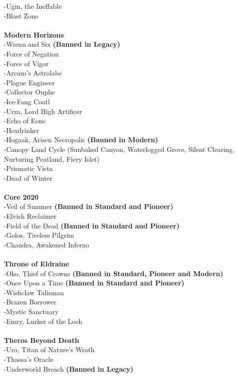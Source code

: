 \documentclass{report}
\begin{document}
-Ugin, the Ineffable\\
-Blast Zone\\
\textbf{\\Modern Horizons\\}
-Wrenn and Six \textbf{(Banned in Legacy)}\\
-Force of Negation\\
-Force of Vigor\\
-Arcum's Astrolabe\\
-Plague Engineer\\
-Collector Ouphe\\
-Ice-Fang Coatl\\
-Urza, Lord High Artificer\\
-Echo of Eons\\
-Hexdrinker\\
-Hogaak, Arisen Necropolis \textbf{(Banned in Modern)}\\
-Canopy Land Cycle (Sunbaked Canyon, Waterlogged Grove, Silent Clearing,\\ Nurturing Peatland, Fiery Islet)\\
-Prismatic Vista\\
-Dead of Winter\\\\
\textbf{Core 2020\\}
-Veil of Summer \textbf{(Banned in Standard and Pioneer)}\\
-Elvish Reclaimer\\
-Field of the Dead \textbf{(Banned in Standard and Pioneer)}\\
-Golos, Tireless Pilgrim\\
-Chandra, Awakened Inferno\\\\
\textbf{Throne of Eldraine\\}
-Oko, Thief of Crowns \textbf{(Banned in Standard, Pioneer and Modern)}\\
-Once Upon a Time \textbf{(Banned in Standard and Pioneer)}\\
-Wishclaw Talisman\\
-Brazen Borrower\\
-Mystic Sanctuary\\
-Emry, Lurker of the Loch\\\\
\textbf{Theros Beyond Death\\}
-Uro, Titan of Nature's Wrath\\
-Thassa's Oracle\\
-Underworld Breach \textbf{(Banned in Legacy)}\\
\end{document}
